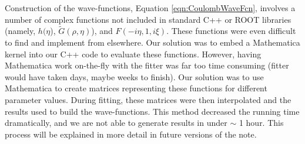 \documentclass[../AnalysisNoteJBuxton.tex]{subfiles}
\begin{document}
Construction of the wave-functions, Equation \ref{eqn:CoulombWaveFcn}, involves a number of complex functions not included in standard C++ or ROOT libraries (namely, $h(\eta$), $\tilde{G}(\rho,\eta)$), and $F(-i\eta,1,i\xi)$.  These functions were even difficult to find and implement from elsewhere.  Our solution was to embed a Mathematica kernel into our C++ code to evaluate these functions.  However, having Mathematica work on-the-fly with the fitter was far too time consuming (fitter would have taken days, maybe weeks to finish).  Our solution was to use Mathematica to create matrices representing these functions for different parameter values.  During fitting, these matrices were then interpolated and the results used to build the wave-functions.  This method decreased the running time dramatically, and we are not able to generate results in under $\sim$ 1 hour. This process will be explained in more detail in future versions of the note.
\end{document}
